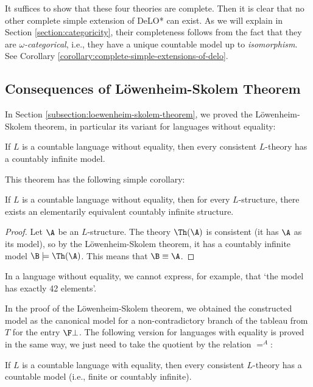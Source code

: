 It suffices to show that these four theories are complete. Then it is clear that no other complete simple extension of DeLO* can exist. As we will explain in Section \ref{section:categoricity}, their completeness follows from the fact that they are \emph{$\omega$-categorical}, i.e., they have a unique countable model up to \emph{isomorphism}. See Corollary \ref{corollary:complete-simple-extensions-of-delo}.

\subsection{Consequences of Löwenheim-Skolem Theorem}

In Section \ref{subsection:loewenheim-skolem-theorem}, we proved the Löwenheim-Skolem theorem, in particular its variant for languages without equality:

\begin{theorem-unnumbered}
    If $L$ is a countable language without equality, then every consistent $L$-theory has a countably infinite model.
\end{theorem-unnumbered}

This theorem has the following simple corollary:

\begin{corollary}\label{corollary:loewenheim-skolem-without-equality}
    If $L$ is a countable language without equality, then for every $L$-structure, there exists an elementarily equivalent countably infinite structure.
\end{corollary}
\begin{proof}
    Let $\A$ be an $L$-structure. The theory $\Th(\A)$ is consistent (it has $\A$ as its model), so by the Löwenheim-Skolem theorem, it has a countably infinite model $\B\models\Th(\A)$. This means that $\B\equiv\A$.
\end{proof}

In a language without equality, we cannot express, for example, that `the model has exactly 42 elements'.

In the proof of the Löwenheim-Skolem theorem, we obtained the constructed model as the canonical model for a non-contradictory branch of the tableau from $T$ for the entry $\F\bot$. The following version for languages with equality is proved in the same way, we just need to take the quotient by the relation $=^A$:

\begin{theorem-unnumbered}
    If $L$ is a countable language with equality, then every consistent $L$-theory has a countable model (i.e., finite or countably infinite).
\end{theorem-unnumbered}

